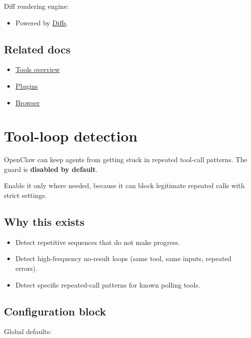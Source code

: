 Diff rendering engine:

\begin{itemize}
  \item Powered by \href{https://diffs.com}{Diffs}.
\end{itemize}


\subsection{Related docs}


\begin{itemize}
  \item \href{/tools}{Tools overview}
  \item \href{/tools/plugin}{Plugins}
  \item \href{/tools/browser}{Browser}
\end{itemize}



\clearpage

\section{Tool-loop detection}


OpenClaw can keep agents from getting stuck in repeated tool-call patterns.
The guard is \textbf{disabled by default}.

Enable it only where needed, because it can block legitimate repeated calls with strict settings.

\subsection{Why this exists}


\begin{itemize}
  \item Detect repetitive sequences that do not make progress.
  \item Detect high-frequency no-result loops (same tool, same inputs, repeated errors).
  \item Detect specific repeated-call patterns for known polling tools.
\end{itemize}


\subsection{Configuration block}


Global defaults:

